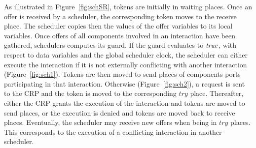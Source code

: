 As illustrated in Figure~\ref{fig:schSR}, tokens are initially in waiting places. Once an offer
is received by a scheduler, the corresponding token moves to the receive place. The scheduler
copies then the values of the offer variables to its local variables. Once offers of all 
components involved in an interaction have been gathered, schedulers computes its guard. If 
the guard evaluates to $\textnormal{\textit{true}}$, with respect to data variables and the global scheduler clock,
the scheduler can either execute the interaction if it is not externally conflicting with
another interaction (Figure~\ref{fig:sch1}). Tokens are then moved to send places of components
ports participating in that interaction. Otherwise (Figure~\ref{fig:sch2}), 
a request is sent to the CRP and the token is moved to the
corresponding $try$ place. Thereafter, either the CRP grants the execution of the interaction
and tokens are moved to send places, or the execution is denied and tokens are moved back
to receive places. Eventually, the scheduler may receive new offers when being in $try$
places. This corresponds to the execution of a conflicting interaction in another scheduler.


